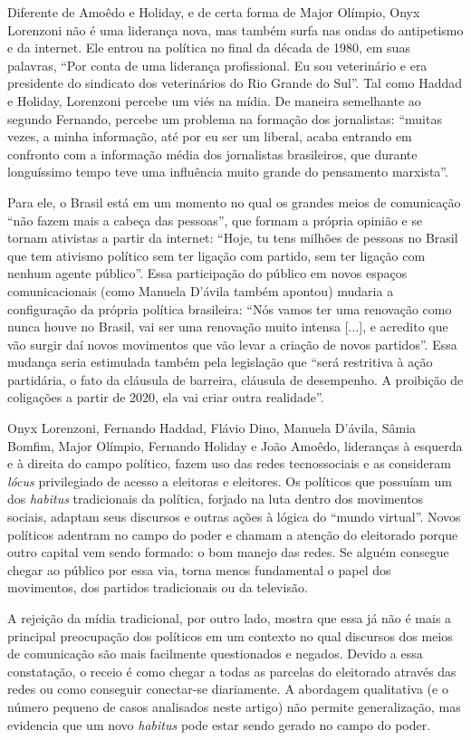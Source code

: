 Diferente de Amoêdo e Holiday, e de certa forma de Major Olímpio, Onyx
Lorenzoni não é uma liderança nova, mas também surfa nas ondas do
antipetismo e da internet. Ele entrou na política no final da década de
1980, em suas palavras, ``Por conta de uma liderança profissional. Eu
sou veterinário e era presidente do sindicato dos veterinários do Rio
Grande do Sul''. Tal como Haddad e Holiday, Lorenzoni percebe um viés na
mídia. De maneira semelhante ao segundo Fernando, percebe um problema na
formação dos jornalistas: ``muitas vezes, a minha informação, até por eu
ser um liberal, acaba entrando em confronto com a informação média dos
jornalistas brasileiros, que durante longuíssimo tempo teve uma
influência muito grande do pensamento marxista''.

Para ele, o Brasil está em um momento no qual os grandes meios de
comunicação ``não fazem mais a cabeça das pessoas'', que formam a
própria opinião e se tornam ativistas a partir da internet: ``Hoje, tu
tens milhões de pessoas no Brasil que tem ativismo político sem ter
ligação com partido, sem ter ligação com nenhum agente público''. Essa
participação do público em novos espaços comunicacionais (como Manuela
D'ávila também apontou) mudaria a configuração da própria política
brasileira: ``Nós vamos ter uma renovação como nunca houve no Brasil,
vai ser uma renovação muito intensa {[}...{]}, e acredito que vão surgir
daí novos movimentos que vão levar a criação de novos partidos''. Essa
mudança seria estimulada também pela legislação que ``será restritiva à
ação partidária, o fato da cláusula de barreira, cláusula de desempenho.
A proibição de coligações a partir de 2020, ela vai criar outra
realidade''.

Onyx Lorenzoni, Fernando Haddad, Flávio Dino, Manuela D'ávila, Sâmia
Bomfim, Major Olímpio, Fernando Holiday e João Amoêdo, lideranças à
esquerda e à direita do campo político, fazem uso das redes
tecnossociais e as consideram \emph{lócus} privilegiado de acesso a
eleitoras e eleitores. Os políticos que possuíam um dos \emph{habitus}
tradicionais da política, forjado na luta dentro dos movimentos sociais,
adaptam seus discursos e outras ações à lógica do ``mundo virtual''.
Novos políticos adentram no campo do poder e chamam a atenção do
eleitorado porque outro capital vem sendo formado: o bom manejo das
redes. Se alguém consegue chegar ao público por essa via, torna menos
fundamental o papel dos movimentos, dos partidos tradicionais ou da
televisão.

A rejeição da mídia tradicional, por outro lado, mostra que essa já não
é mais a principal preocupação dos políticos em um contexto no qual
discursos dos meios de comunicação são mais facilmente questionados e
negados. Devido a essa constatação, o receio é como chegar a todas as
parcelas do eleitorado através das redes ou como conseguir conectar-se
diariamente. A abordagem qualitativa (e o número pequeno de casos
analisados neste artigo) não permite generalização, mas evidencia que um
novo \emph{habitus} pode estar sendo gerado no campo do poder.

